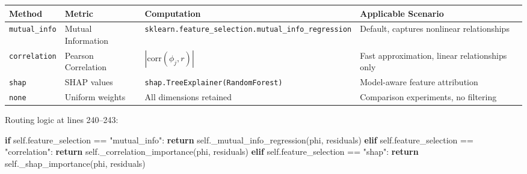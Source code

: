 \documentclass[
  12pt,
]{article}
\newenvironment{Shaded}{}{}
\newcommand{\ControlFlowTok}[1]{\textcolor[rgb]{0.00,0.44,0.13}{\textbf{#1}}}
\newcommand{\NormalTok}[1]{#1}
\newcommand{\OperatorTok}[1]{\textcolor[rgb]{0.40,0.40,0.40}{#1}}
\newcommand{\StringTok}[1]{\textcolor[rgb]{0.25,0.44,0.63}{#1}}
\newcommand{\VariableTok}[1]{\textcolor[rgb]{0.10,0.09,0.49}{#1}}
\begin{document}
\begin{longtable}[]{@{}
  >{\raggedright\arraybackslash}p{}
  >{\raggedright\arraybackslash}p{}
  >{\raggedright\arraybackslash}p{}
  >{\raggedright\arraybackslash}p{}@{}}
\toprule\noalign{}
\begin{minipage}[b]{\linewidth}\raggedright
Method
\end{minipage} & \begin{minipage}[b]{\linewidth}\raggedright
Metric
\end{minipage} & \begin{minipage}[b]{\linewidth}\raggedright
Computation
\end{minipage} & \begin{minipage}[b]{\linewidth}\raggedright
Applicable Scenario
\end{minipage} \\
\midrule\noalign{}
\endhead
\bottomrule\noalign{}
\endlastfoot
\texttt{mutual\_info} & Mutual Information & \texttt{sklearn.feature\_selection.mutual\_info\_regression} & Default, captures nonlinear relationships \\
\texttt{correlation} & Pearson Correlation & $|\text{corr}(\phi_j, r)|$ & Fast approximation, linear relationships only \\
\texttt{shap} & SHAP values & \texttt{shap.TreeExplainer(RandomForest)} & Model-aware feature attribution \\
\texttt{none} & Uniform weights & All dimensions retained & Comparison experiments, no filtering \\
\end{longtable}

Routing logic at lines 240--243:

\begin{Shaded}
\begin{Highlighting}[]
\ControlFlowTok{if} \VariableTok{self}\NormalTok{.feature\_selection }\OperatorTok{==} \StringTok{"mutual\_info"}\NormalTok{:}
    \ControlFlowTok{return} \VariableTok{self}\NormalTok{.\_mutual\_info\_regression(phi, residuals)}
\ControlFlowTok{elif} \VariableTok{self}\NormalTok{.feature\_selection }\OperatorTok{==} \StringTok{"correlation"}\NormalTok{:}
    \ControlFlowTok{return} \VariableTok{self}\NormalTok{.\_correlation\_importance(phi, residuals)}
\ControlFlowTok{elif} \VariableTok{self}\NormalTok{.feature\_selection }\OperatorTok{==} \StringTok{"shap"}\NormalTok{:}
    \ControlFlowTok{return} \VariableTok{self}\NormalTok{.\_shap\_importance(phi, residuals)}
\end{Highlighting}
\end{Shaded}
\end{document}
